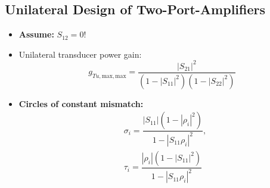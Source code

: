 \subsection{Unilateral Design of Two-Port-Amplifiers}
\begin{itemize}
    \item \textbf{Assume:} $S_{12} = 0$!
    \item Unilateral transducer power gain:
        \begin{equation*}
            g_{Tu,\mathrm{max},\mathrm{max}} = \frac{|S_{21}|^2}{(1 - |S_{11}|^2)(1 - |S_{22}|^2)}
        \end{equation*}
    \item \textbf{Circles of constant mismatch:}
        \begin{align*}
            &\sigma_i = \dfrac{|S_{11}| (1 - |\rho_i|^2)}{1 - |S_{11}\rho_i|^2},\\
            &\tau_i = \dfrac{|\rho_i| (1 - |S_{11}|^2)}{1 - |S_{11}\rho_i|^2}
        \end{align*}
\end{itemize}
